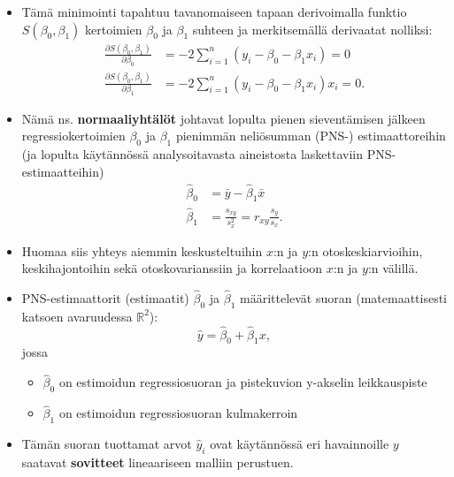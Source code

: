 \documentclass[
]{book}
\providecommand{\tightlist}{%
  \setlength{\itemsep}{0pt}\setlength{\parskip}{0pt}}
\begin{document}
\begin{itemize}
\item
  Tämä minimointi tapahtuu tavanomaiseen tapaan derivoimalla funktio \(S(\beta_0,\beta_1)\) kertoimien \(\beta_0\) ja \(\beta_1\) suhteen ja merkitsemällä derivaatat nolliksi:
  \begin{align*}
  \frac{\partial S(\beta_0,\beta_1)}{\partial \beta_0} &= -2 \sum_{i=1}^{n} (y_i - \beta_0 - \beta_1 x_i) = 0 \\
  \frac{\partial S(\beta_0,\beta_1)}{\partial \beta_1} &= -2 \sum_{i=1}^{n} (y_i - \beta_0 - \beta_1 x_i) x_i = 0. 
  \end{align*}
\item
  Nämä ns. \textbf{normaaliyhtälöt} johtavat lopulta pienen sieventämisen jälkeen regressiokertoimien \(\beta_0\) ja \(\beta_1\) pienimmän neliösumman (PNS-) estimaattoreihin (ja lopulta käytännössä analysoitavasta aineistosta laskettaviin PNS-estimaatteihin)
  \begin{align*}
  \widehat{\beta}_0 &= \bar{y} - \widehat{\beta}_1 \bar{x} \\
  \widehat{\beta}_1 &= \frac{s_{xy}}{s^2_x} = r_{xy} \frac{s_y}{s_x}.
  \end{align*}
\item
  Huomaa siis yhteys aiemmin keskusteltuihin \(x\):n ja \(y\):n otoskeskiarvioihin, keskihajontoihin sekä otoskovarianssiin ja korrelaatioon \(x\):n ja \(y\):n välillä.
\item
  PNS-estimaattorit (estimaatit) \(\widehat{\beta}_0\) ja \(\widehat{\beta}_1\) määrittelevät suoran (matemaattisesti katsoen avaruudessa \(\mathbb{R}^2\)):
  \[
  \widehat{y} = \widehat{\beta}_0 + \widehat{\beta}_1 x,
  \]
  jossa

  \begin{itemize}
  \tightlist
  \item
    \(\widehat{\beta}_0\) on estimoidun regressiosuoran ja pistekuvion y-akselin leikkauspiste
  \item
    \(\widehat{\beta}_1\) on estimoidun regressiosuoran kulmakerroin
  \end{itemize}
\item
  Tämän suoran tuottamat arvot \(\widehat{y}_i\) ovat käytännössä eri havainnoille \(y\) saatavat \textbf{sovitteet} lineaariseen malliin perustuen.
\end{itemize}

\hfill\break
\end{document}

